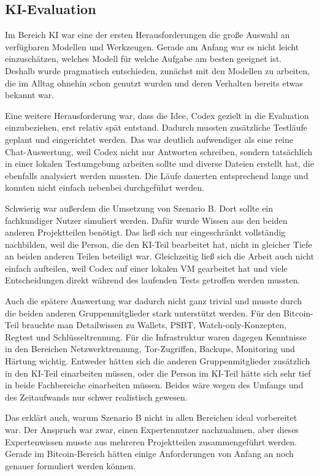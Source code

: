 \subsection{KI-Evaluation}
Im Bereich \acs{KI} war eine der ersten Herausforderungen die große Auswahl an verfügbaren Modellen und Werkzeugen. Gerade am Anfang war es nicht leicht einzuschätzen, welches Modell für welche Aufgabe am besten geeignet ist. Deshalb wurde pragmatisch entschieden, zunächst mit den Modellen zu arbeiten, die im Alltag ohnehin schon genutzt wurden und deren Verhalten bereits etwas bekannt war.

Eine weitere Herausforderung war, dass die Idee, Codex gezielt in die Evaluation einzubeziehen, erst relativ spät entstand. Dadurch mussten zusätzliche Testläufe geplant und eingerichtet werden. Das war deutlich aufwendiger als eine reine Chat-Auswertung, weil Codex nicht nur Antworten schreiben, sondern tatsächlich in einer lokalen Testumgebung arbeiten sollte und diverse Dateien erstellt hat, die ebenfalls analysiert werden mussten. Die Läufe dauerten entsprechend lange und konnten nicht einfach nebenbei durchgeführt werden.

Schwierig war außerdem die Umsetzung von Szenario B. Dort sollte ein fachkundiger Nutzer simuliert werden. Dafür wurde Wissen aus den beiden anderen Projektteilen benötigt. Das ließ sich nur eingeschränkt vollständig nachbilden, weil die Person, die den \acs{KI}-Teil bearbeitet hat, nicht in gleicher Tiefe an beiden anderen Teilen beteiligt war. Gleichzeitig ließ sich die Arbeit auch nicht einfach aufteilen, weil Codex auf einer lokalen \acs{VM} gearbeitet hat und viele Entscheidungen direkt während des laufenden Tests getroffen werden mussten.

Auch die spätere Auswertung war dadurch nicht ganz trivial und musste durch die beiden anderen Gruppenmitglieder stark unterstützt werden. Für den Bitcoin-Teil brauchte man Detailwissen zu Wallets, PSBT, Watch-only-Konzepten, Regtest und Schlüsseltrennung. Für die Infrastruktur waren dagegen Kenntnisse in den Bereichen Netzwerktrennung, Tor-Zugriffen, Backups, Monitoring und Härtung wichtig. Entweder hätten sich die anderen Gruppenmitglieder zusätzlich in den \acs{KI}-Teil einarbeiten müssen, oder die Person im \acs{KI}-Teil hätte sich sehr tief in beide Fachbereiche einarbeiten müssen. Beides wäre wegen des Umfangs und des Zeitaufwands nur schwer realistisch gewesen.

Das erklärt auch, warum Szenario B nicht in allen Bereichen ideal vorbereitet war. Der Anspruch war zwar, einen Expertennutzer nachzuahmen, aber dieses Expertenwissen musste aus mehreren Projektteilen zusammengeführt werden. Gerade im Bitcoin-Bereich hätten einige Anforderungen von Anfang an noch genauer formuliert werden können.


